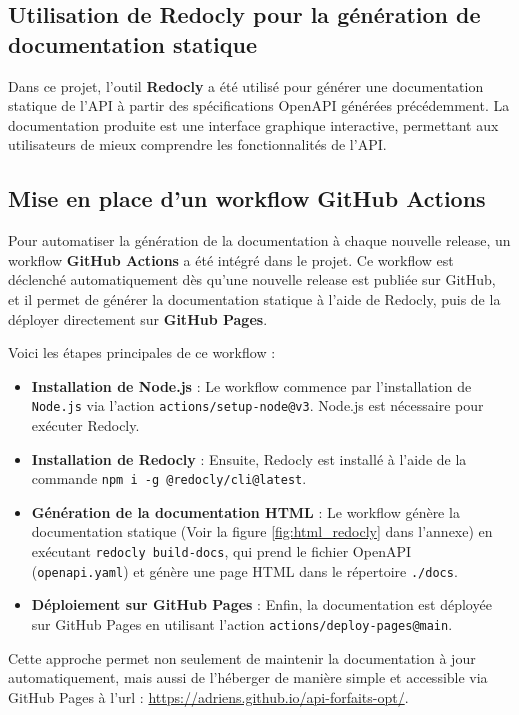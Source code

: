 \documentclass{article}
\begin{document}
	\subsection{Utilisation de Redocly pour la génération de documentation statique}
	\label{subsec:redocly}
	
	Dans ce projet, l'outil \textbf{Redocly} a été utilisé pour générer une documentation statique de l'API à partir des spécifications OpenAPI générées précédemment. La documentation produite est une interface graphique interactive, permettant aux utilisateurs de mieux comprendre les fonctionnalités de l'API.
	
	\subsection{Mise en place d'un workflow GitHub Actions}
	
	Pour automatiser la génération de la documentation à chaque nouvelle release, un workflow \textbf{GitHub Actions} a été intégré dans le projet. Ce workflow est déclenché automatiquement dès qu'une nouvelle release est publiée sur GitHub, et il permet de générer la documentation statique à l'aide de Redocly, puis de la déployer directement sur \textbf{GitHub Pages}.
	
	Voici les étapes principales de ce workflow :
	\begin{itemize}
		\item \textbf{Installation de Node.js} : Le workflow commence par l'installation de \texttt{Node.js} via l'action \texttt{actions/setup-node@v3}. Node.js est nécessaire pour exécuter Redocly.
		\item \textbf{Installation de Redocly} : Ensuite, Redocly est installé à l'aide de la commande \texttt{npm i -g @redocly/cli@latest}.
		\item \textbf{Génération de la documentation HTML} : Le workflow génère la documentation statique (Voir la figure \ref{fig:html_redocly} dans l'annexe) en exécutant \texttt{redocly build-docs}, qui prend le fichier OpenAPI (\texttt{openapi.yaml}) et génère une page HTML dans le répertoire \texttt{./docs}.
		\item \textbf{Déploiement sur GitHub Pages} : Enfin, la documentation est déployée sur GitHub Pages en utilisant l'action \texttt{actions/deploy-pages@main}.
	\end{itemize}
	
	Cette approche permet non seulement de maintenir la documentation à jour automatiquement, mais aussi de l'héberger de manière simple et accessible via GitHub Pages à l'url : \url{https://adriens.github.io/api-forfaits-opt/}.
	
\end{document}
